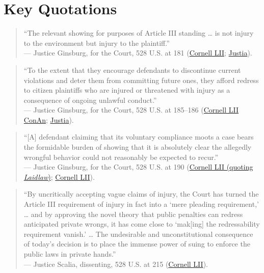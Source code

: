 \documentclass[12pt]{article}
\begin{document}
\section{Key Quotations}
\begin{quote}
``The relevant showing for purposes of Article III standing \ldots{} is not injury to the environment but injury to the plaintiff.'' \\
--- Justice Ginsburg, for the Court, 528 U.S. at 181 (\href{https://www.law.cornell.edu/supct/html/98-822.ZD.html}{Cornell LII}; \href{https://supreme.justia.com/cases/federal/us/528/167/}{Justia}).
\end{quote}

\begin{quote}
``To the extent that they encourage defendants to discontinue current violations and deter them from committing future ones, they afford redress to citizen plaintiffs who are injured or threatened with injury as a consequence of ongoing unlawful conduct.'' \\
--- Justice Ginsburg, for the Court, 528 U.S. at 185--186 (\href{https://www.law.cornell.edu/constitution-conan/article-3/section-2/clause-1/redressability}{Cornell LII ConAn}; \href{https://supreme.justia.com/cases/federal/us/528/167/}{Justia}).
\end{quote}

\begin{quote}
``[A] defendant claiming that its voluntary compliance moots a case bears the formidable burden of showing that it is absolutely clear the allegedly wrongful behavior could not reasonably be expected to recur.'' \\
--- Justice Ginsburg, for the Court, 528 U.S. at 190 (\href{https://www.law.cornell.edu/supremecourt/text/11-982}{Cornell LII (quoting \textit{Laidlaw})}; \href{https://www.law.cornell.edu/supremecourt/text/528/167}{Cornell LII}).
\end{quote}

\begin{quote}
``By uncritically accepting vague claims of injury, the Court has turned the Article III requirement of injury in fact into a `mere pleading requirement,' \ldots{} and by approving the novel theory that public penalties can redress anticipated private wrongs, it has come close to `mak[ing] the redressability requirement vanish.' \ldots{} The undesirable and unconstitutional consequence of today's decision is to place the immense power of suing to enforce the public laws in private hands.'' \\
--- Justice Scalia, dissenting, 528 U.S. at 215 (\href{https://www.law.cornell.edu/supct/html/98-822.ZD.html}{Cornell LII}).
\end{quote}
\end{document}
